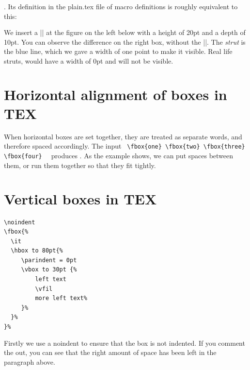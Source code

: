{\CMDI{\strut}. 
Its definition in the plain.tex file of macro definitions is roughly
equivalent to this:

\begin{teX}
  \def \strut {\vrule height 8.5pt depth 3.5pt width 0pt}
\end{teX}

We insert a |\vrule| at the figure on the left below with a height of 20pt and a depth of 10pt. You can observe the difference on the right box, without the |\vrule|. The \textit{strut} is the blue line, which we gave a width of one point to make it visible. Real life struts, would have a width of 0pt and will not be visible. 




\section{Horizontal alignment of boxes in TEX}

When horizontal boxes are set together, they are treated as separate words,
and therefore spaced accordingly. The input
\verb+ \fbox{one} \fbox{two} \fbox{three} \fbox{four}  +
produces     . As the example shows, we can put spaces
between them, or run them together so that they fit tightly.


\section{Vertical boxes in TEX}


\begin{minipage}{2.0in}
\begin{verbatim}
\noindent
\fbox{%
  \it
  \hbox to 80pt{%
     \parindent = 0pt
     \vbox to 30pt {%
         left text
         \vfil
         more left text%
     }%
  }%
}%
\end{verbatim}
\end{minipage}


{}%

Firstly we use a noindent to ensure that the box is not indented. If you comment the out, you can see that the right amount of space has been left in the paragraph above.

}
